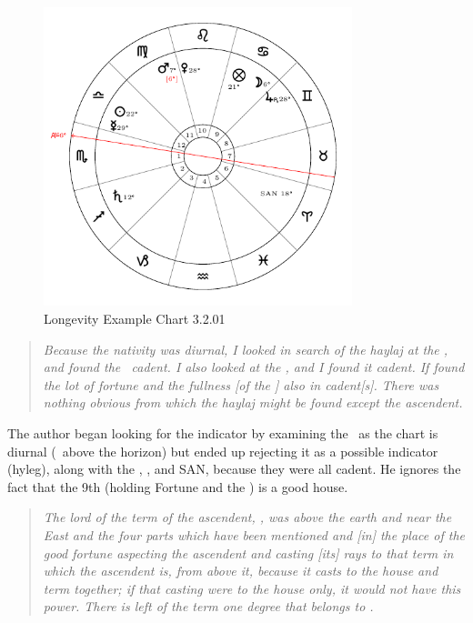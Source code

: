 \begin{figure}[H]
\centering
\includegraphics[width=0.8\textwidth]{charts/3_2_01}
\vspace{-1em}
\caption{Longevity Example Chart 3.2.01}
\end{figure}

\begin{quote}
\textsl{Because the nativity was diurnal, I looked in search of the haylaj at the \Sun, and found the \Sun\, cadent. I also looked at the \Moon, and I found it cadent. If found the lot of fortune and the fullness [of the \Moon] also in cadent[s]. There was nothing obvious from which the haylaj might be found except the ascendent.}
\end{quote}

The author began looking for the indicator by examining the \Sun\, as the chart is diurnal (\Sun\, above the horizon) but ended up rejecting it as a possible indicator (hyleg), along with the \Moon, \Fortune, and SAN, because they were all cadent. He ignores the fact that the 9th (holding Fortune and the \Moon) is a good house.

\begin{quote}
\textsl{The lord of the term of the ascendent, \Mars, was above the earth and near the East and the four parts which have been mentioned and [in] the place of the good fortune aspecting the ascendent and casting [its] rays to that term in which the ascendent is, from above it, because it casts to the house and term together; if that casting were to the house only, it would not have this power. There is left of the term one degree that belongs to \Mars.}
\end{quote}

